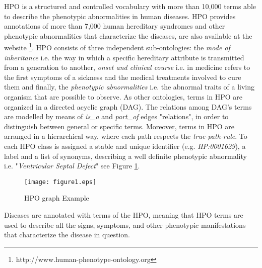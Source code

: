 \documentclass{article}
\theoremstyle{definition}
\begin{document}
 HPO is a structured and controlled vocabulary with more than 10,000 terms able to describe the phenotypic abnormalities in human diseases. HPO provides annotations of more than 7,000 human hereditary syndromes and other phenotypic abnormalities that characterize the diseases, are also available at the website \footnote{http://www.human-phenotype-ontology.org}. 
 HPO consists of three independent sub-ontologies: the \textit{mode of inheritance} i.e. the way in which a specific hereditary attribute is transmitted from a generation to another, \textit{onset and clinical course} i.e. in medicine refers to the first symptoms of a sickness and the medical treatments involved to cure them and finally, the \textit{phenotypic abnormalities} i.e.  the abnormal traits of a living organism that are possible to observe. As other ontologies, terms in HPO are organized in a directed acyclic graph (DAG). The relations among DAG's terms are modelled by means of \textit{is\_a} and \textit{part\_of} edges "relations", in order to distinguish between general or specific terms. Moreover, terms in HPO are arranged in a hierarchical way, where each path respects the \textit{true-path-rule}. To each HPO class is assigned a  stable and unique identifier (e.g. \textit{HP:0001629}), a label and a list of synonyms,  describing a well definite phenotypic abnormality i.e. "\textit{Ventricular Septal Defect}" see Figure \ref{fig:path}. 
 
  
 \begin{figure}[h]
\centering
 \texttt{[image: figure1.eps]}
   \caption{HPO graph Example}
\label{fig:path}
\end{figure}


Diseases are annotated with terms of the HPO, meaning that HPO terms are used to describe all the signs, symptoms, and other phenotypic manifestations that characterize the disease in question. %
 
\end{document}
